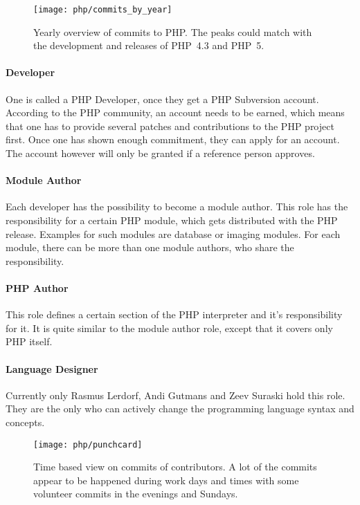 \begin{figure}[htbp]
  \centering
  \texttt{[image: php/commits\_by\_year]}
  \caption[Commits by year, PHP]
  {Yearly overview of commits to PHP. The peaks could match with the
    development and releases of PHP~4.3 and PHP~5.}
\end{figure}

\paragraph{Developer}

One is called a PHP Developer, once they get a PHP Subversion account.
According to the PHP community, an account needs to be earned, which means that
one has to provide several patches and contributions to the PHP project first.
Once one has shown enough commitment, they can apply for an account. The
account however will only be granted if a reference person approves.

\paragraph{Module Author}

Each developer has the possibility to become a module author. This role has the
responsibility for a certain PHP module, which gets distributed with the PHP
release. Examples for such modules are database or imaging modules. For each
module, there can be more than one module authors, who share the
responsibility.

\paragraph{PHP Author}

This role defines a certain section of the PHP interpreter and it's
responsibility for it. It is quite similar to the module author role, except
that it covers only PHP itself.

\paragraph{Language Designer}

Currently only Rasmus Lerdorf, Andi Gutmans and Zeev Suraski hold this role.
They are the only who can actively change the programming language syntax and
concepts.

\begin{figure}[hbtp]
  \centering
  \texttt{[image: php/punchcard]}
  \caption[Time based view on commits, PHP]
  {Time based view on commits of contributors. A lot of the commits appear to
    be happened during work days and times with some volunteer commits in the
    evenings and Sundays.}
\end{figure}

